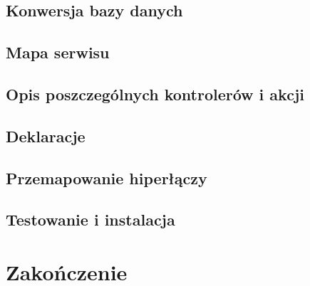 \documentclass[a4paper,12pt,oneside]{report}
\begin{document}
\section{Konwersja bazy danych}
\label{sec:db-konwersja}

\section{Mapa serwisu}
\label{sec:mapa}

\section{Opis poszczególnych kontrolerów i akcji}
\label{sec:kontrolery}

\section{Deklaracje}
\label{sec:deklaracje}

\section{Przemapowanie hiperłączy}
\label{sec:mapa-linkow}

\section{Testowanie i instalacja}
\label{sec:testowanie}

\chapter{Zakończenie}
\label{cha:end}
\end{document}

